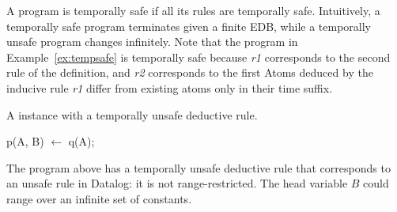 
A \slang program is temporally safe if all its rules are temporally safe.
Intuitively, a temporally safe program terminates  given a finite EDB, while a
temporally unsafe program changes infinitely.  Note that the \slang program in
Example~\ref{ex:tempsafe} is temporally safe because \emph{r1} corresponds to
the second rule of the definition, and \emph{r2} corresponds to the first Atoms
deduced by the inducive rule \emph{r1} differ from existing atoms only in their
time suffix.

\begin{example}
A \slang instance with a temporally unsafe deductive rule.

\begin{Dedalus}
p(A, B) \(\leftarrow\) q(A);
\end{Dedalus}

The program above has a temporally unsafe deductive rule that corresponds to an
unsafe rule in Datalog: it is not range-restricted.  The head variable $B$
could range over an infinite set of constants.
\end{example}


